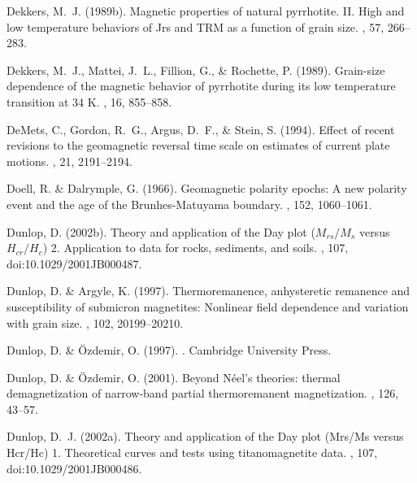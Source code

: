 \documentclass[11pt]{book}
\begin{document}
\begin{thebibliography}{}
Dekkers, M.~J. (1989b).
\newblock Magnetic properties of natural pyrrhotite. {II}. High and low
  temperature behaviors of Jrs and {TRM} as a function of grain size.
, 57, 266--283.

Dekkers, M.~J., Mattei, J.~L., Fillion, G., \& Rochette, P. (1989).
\newblock Grain-size dependence of the magnetic behavior of pyrrhotite during
  its low temperature transition at 34 {K}.
, 16, 855--858.

DeMets, C., Gordon, R.~G., Argus, D.~F., \& Stein, S. (1994).
\newblock Effect of recent revisions to the geomagnetic reversal time scale on
  estimates of current plate motions.
, 21, 2191--2194.

Doell, R. \& Dalrymple, G. (1966).
\newblock Geomagnetic polarity epochs: A new polarity event and the age of the
  Brunhes-Matuyama boundary.
, 152, 1060--1061.

Dunlop, D. (2002b).
\newblock Theory and application of the Day plot ($M_{rs}/M_s$ versus
  $H_{cr}/H_c$) 2. Application to data for rocks, sediments, and soils.
, 107, doi:10.1029/2001JB000487.

Dunlop, D. \& Argyle, K. (1997).
\newblock Thermoremanence, anhysteretic remanence and susceptibility of
  submicron magnetites: Nonlinear field dependence and variation with grain
  size.
, 102, 20199--20210.

Dunlop, D. \& \"Ozdemir, O. (1997).
.
\newblock Cambridge University Press.

Dunlop, D. \& \"Ozdemir, O. (2001).
\newblock Beyond N\'eel's theories: thermal demagnetization of narrow-band
  partial thermoremanent magnetization.
, 126, 43--57.

Dunlop, D.~J. (2002a).
\newblock Theory and application of the Day plot (Mrs/Ms versus Hcr/Hc) 1.
  Theoretical curves and tests using titanomagnetite data.
, 107, doi:10.1029/2001JB000486.


\end{thebibliography}
\end{document}

